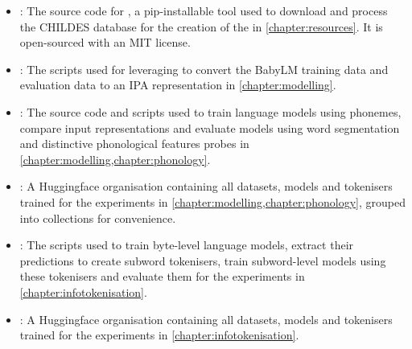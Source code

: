 \begin{itemize}
    \item \href{https://github.com/codebyzeb/childes-processor}{}: The source code for \gpp, a pip-installable tool used to download and process the CHILDES database for the creation of the \ipachildes in \cref{chapter:resources}. It is open-sourced with an MIT license.
    \item \href{https://github.com/codebyzeb/babylm-ipa}{}: The scripts used for leveraging \gpp to convert the BabyLM training data and evaluation data to an IPA representation in \cref{chapter:modelling}.
    \item \href{https://github.com/codebyzeb/PhonemeTransformers}{}: The source code and scripts used to train language models using phonemes, compare input representations and evaluate models using word segmentation and distinctive phonological features probes in \cref{chapter:modelling,chapter:phonology}. 
    \item \href{https://huggingface.co/phonemetransformers}{}: A Huggingface organisation containing all datasets, models and tokenisers trained for the experiments in \cref{chapter:modelling,chapter:phonology}, grouped into collections for convenience.
    \item \href{https://github.com/codebyzeb/infotokenization}{}: The scripts used to train byte-level language models, extract their predictions to create subword tokenisers, train subword-level models using these tokenisers and evaluate them for the experiments in \cref{chapter:infotokenisation}.
    \item \href{https://huggingface.co/Infotokenizers}{}: A Huggingface organisation containing all datasets, models and tokenisers trained for the experiments in \cref{chapter:infotokenisation}.
\end{itemize}
